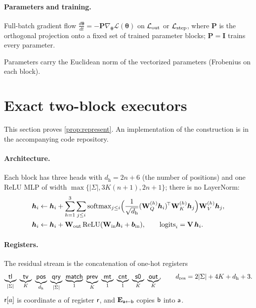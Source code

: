 \paragraph{Parameters and training.}

\begin{assumption}[Training]
\label{ass:gd}
Full-batch gradient flow $\tfrac{d\bm\theta}{dt}=-\mathbf P\nabla_{\bm\theta}\mathcal L(\bm\theta)$ on $\mathcal L_{\mathrm{out}}$ or $\mathcal L_{\mathrm{step}}$, where $\mathbf P$ is the orthogonal
projection onto a fixed set of trained parameter blocks; $\mathbf P=\mathbf I$ trains every parameter.
\end{assumption}

\label{rem:norms}Parameters carry the Euclidean norm of the vectorized parameters (Frobenius on each block).


\section{Exact two-block executors}
\label{app:architectures}

This section proves \cref{prop:represent}. An implementation of the construction is in the accompanying code repository.

\paragraph{Architecture.}
\label{app:construction}
\label{app:model}
Each block has three heads with $d_{\mathrm h}=2n+6$ (the number of positions) and one ReLU MLP of width $\max\{|\Sigma|,3K(n+1),2n+1\}$;
there is no LayerNorm:
\begin{align*}
 \bm h_i&\leftarrow \bm h_i+\sum_{h=1}^{3}\sum_{j\le i}\operatorname{softmax}_{j\le i}\Bigl(\tfrac{1}{\sqrt{d_{\mathrm h}}}(\mathbf W^{(h)}_Q\bm h_i)^{\!\top}\mathbf W^{(h)}_K\bm h_j\Bigr)\mathbf W^{(h)}_V\bm h_j,\\
 \bm h_i&\leftarrow \bm h_i+\mathbf W_{\mathrm{out}}\relu(\mathbf W_{\mathrm{in}}\bm h_i+\bm b_{\mathrm{in}}),\qquad \mathrm{logits}_i=\mathbf V\,\bm h_i .
\end{align*}

\paragraph{Registers.} The residual stream is the concatenation of one-hot registers
\[
 \underbrace{\reg{tl}}_{|\Sigma|}\ \underbrace{\reg{tv}}_{K}\ \underbrace{\reg{pos}}_{d_{\mathrm h}}\ \underbrace{\reg{qry}}_{|\Sigma|}\ \underbrace{\reg{match}}_{1}\
 \underbrace{\reg{prev}}_{K}\ \underbrace{\reg{mt}}_{1}\ \underbrace{\reg{cnt}}_{1}\ \underbrace{\reg{s0}}_{K}\ \underbrace{\reg{out}}_{K},
 \qquad d_{\mathrm{res}}=2|\Sigma|+4K+d_{\mathrm h}+3 .
\]
$\mathsf{r}[a]$ is coordinate $a$ of register $\mathsf{r}$, and $\mathbf E_{\mathsf{a}\leftarrow\mathsf{b}}$ copies $\mathsf{b}$ into $\mathsf{a}$.

